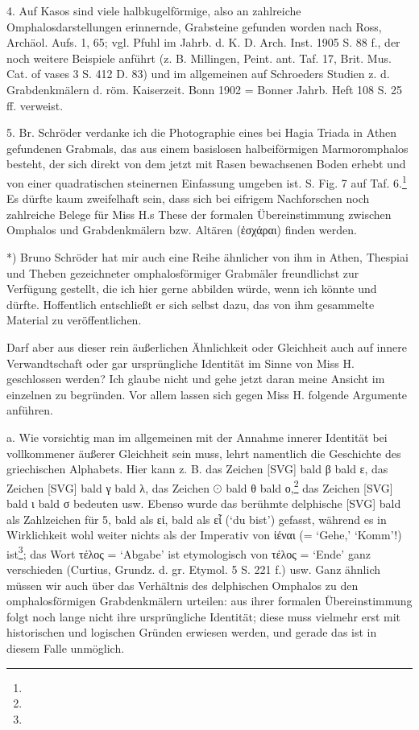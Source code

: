 \documentclass[a4paper, 11pt, oneside]{article}
\begin{document}
4. Auf Kasos sind viele halbkugelförmige, also an zahlreiche Omphalosdarstellungen erinnernde, Grabsteine gefunden worden nach Ross, Archäol. Aufs. 1, 65; vgl. Pfuhl im Jahrb. d. K. D. Arch. Inst. 1905 S. 88 f., der noch weitere Beispiele anführt (z. B. Millingen, Peint. ant. Taf. 17, Brit. Mus. Cat. of vases 3 S. 412 D. 83) und im allgemeinen auf Schroeders Studien z. d. Grabdenkmälern d. röm. Kaiserzeit. Bonn 1902 = Bonner Jahrb. Heft 108 S. 25 ff. verweist.

5. Br. Schröder verdanke ich die Photographie eines bei Hagia Triada in Athen gefundenen Grabmals, das aus einem basislosen halbeiförmigen Marmoromphalos besteht, der sich direkt von dem jetzt mit Rasen bewachsenen Boden erhebt und von einer quadratischen steinernen Einfassung umgeben ist. S. Fig. 7 auf Taf. 6.\footnote{} Es dürfte kaum zweifelhaft sein, dass sich bei eifrigem Nachforschen noch zahlreiche Belege für Miss H.s These der formalen Übereinstimmung zwischen Omphalos und Grabdenkmälern bzw. Altären (ἐσχάραι) finden werden.

*) Bruno Schröder hat mir auch eine Reihe ähnlicher von ihm in Athen, Thespiai und Theben gezeichneter omphalosförmiger Grabmäler freundlichst zur Verfügung gestellt, die ich hier gerne abbilden würde, wenn ich könnte und dürfte. Hoffentlich entschließt er sich selbst dazu, das von ihm gesammelte Material zu veröffentlichen.

Darf aber aus dieser rein äußerlichen Ähnlichkeit oder Gleichheit auch auf innere Verwandtschaft oder gar ursprüngliche Identität im Sinne von Miss H. geschlossen werden? Ich glaube nicht und gehe jetzt daran meine Ansicht im einzelnen zu begründen. Vor allem lassen sich gegen Miss H. folgende Argumente anführen.

a. Wie vorsichtig man im allgemeinen mit der Annahme innerer Identität bei vollkommener äußerer Gleichheit sein muss, lehrt namentlich die Geschichte des griechischen Alphabets. Hier kann z. B. das Zeichen [SVG] bald β bald ε, das Zeichen [SVG] bald γ bald λ, das Zeichen $\odot$ bald θ bald ο,\footnote{} das Zeichen [SVG] bald ι bald σ bedeuten usw. Ebenso wurde das berühmte delphische [SVG] bald als Zahlzeichen für 5, bald als εἰ, bald als εἶ (`du bist') gefasst, während es in Wirklichkeit wohl weiter nichts als der Imperativ von ἰέναι (= `Gehe,' `Komm'!) ist\footnote{}; das Wort τέλος = `Abgabe' ist etymologisch von τέλος = `Ende' ganz verschieden (Curtius, Grundz. d. gr. Etymol. 5 S. 221 f.) usw. Ganz ähnlich müssen wir auch über das Verhältnis des delphischen Omphalos zu den omphalosförmigen Grabdenkmälern urteilen: aus ihrer formalen Übereinstimmung folgt noch lange nicht ihre ursprüngliche Identität; diese muss vielmehr erst mit historischen und logischen Gründen erwiesen werden, und gerade das ist in diesem Falle unmöglich.
\end{document}
